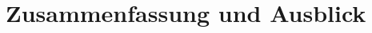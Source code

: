 \documentclass[course=asp]{aspdoc}
\begin{document}


\newpage
\section{Zusammenfassung und Ausblick}


{}
\end{document}
